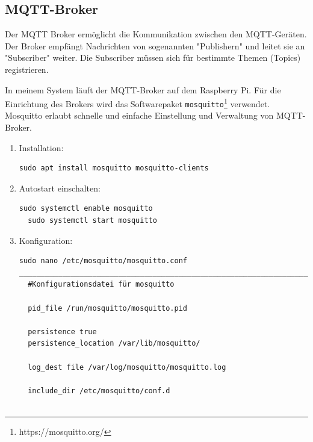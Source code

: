 \documentclass[12pt, letterpaper]{article}
\begin{document}
\subsection{MQTT-Broker}
\par Der MQTT Broker ermöglicht die Kommunikation zwischen den MQTT-Geräten. Der Broker empfängt Nachrichten von sogenannten "Publishern" und leitet sie an "Subscriber" weiter. Die Subscriber müssen sich für bestimmte Themen (Topics) registrieren.
\par In meinem System läuft der MQTT-Broker auf dem Raspberry Pi. Für die Einrichtung des Brokers wird das Softwarepaket \texttt{mosquitto}\footnote[6]{https://mosquitto.org/} verwendet. Mosquitto erlaubt schnelle und einfache Einstellung und Verwaltung von MQTT-Broker. 
\par 
\begin{enumerate}
  \item Installation:
\begin{Verbatim}[frame=single]
  sudo apt install mosquitto mosquitto-clients
\end{Verbatim}
\item Autostart einschalten:
\begin{Verbatim}[frame=single]
  sudo systemctl enable mosquitto
  sudo systemctl start mosquitto
\end{Verbatim}
\item Konfiguration:
\begin{Verbatim}[frame=single]
  sudo nano /etc/mosquitto/mosquitto.conf
_____________________________________________________________________________
  #Konfigurationsdatei für mosquitto

  pid_file /run/mosquitto/mosquitto.pid

  persistence true
  persistence_location /var/lib/mosquitto/

  log_dest file /var/log/mosquitto/mosquitto.log

  include_dir /etc/mosquitto/conf.d


\end{Verbatim}
\end{enumerate}
\end{document}
